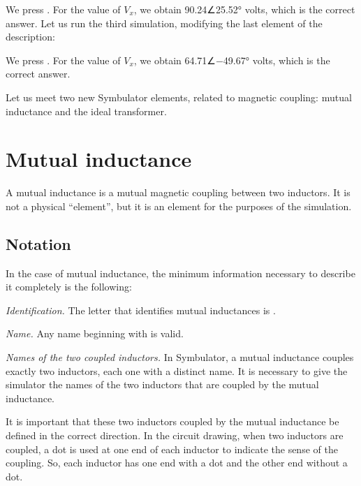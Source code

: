 
We press . For the value of $V_x$, we obtain
90.24∠25.52° volts, which is the correct answer. Let us run the
third simulation, modifying the last element of the description:


We press . For the value of $V_x$, we obtain
64.71∠$-$49.67° volts, which is the correct answer.

Let us meet two new Symbulator elements, related to magnetic
coupling: mutual inductance and the ideal transformer.

\section{Mutual inductance}

A mutual inductance is a mutual magnetic coupling between two
inductors. It is not a physical ``element'', but it is an element
for the purposes of the simulation.

\subsection{Notation}

In the case of mutual inductance, the minimum information necessary
to describe it completely is the following:

\emph{Identification.} The letter that identifies mutual inductances
is .

\emph{Name.} Any name beginning with  is valid.

\emph{Names of the two coupled inductors.} In Symbulator, a mutual
inductance couples exactly two inductors, each one with a distinct
name. It is necessary to give the simulator the names of the two
inductors that are coupled by the mutual inductance.

It is important that these two inductors coupled by the mutual
inductance be defined in the correct direction. In the circuit
drawing, when two inductors are coupled, a dot is used at one end of
each inductor to indicate the sense of the coupling. So, each
inductor has one end with a dot and the other end without a dot.

